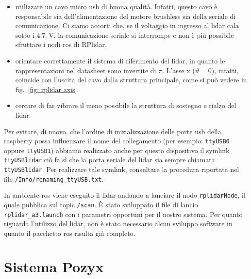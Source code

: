 \begin{itemize}
	\item utilizzare un cavo micro usb di buona qualità. Infatti, questo cavo è responsabile sia dell'alimentazione del motore brushless sia della seriale di comunicazione.
			Ci siamo accorti che, se il voltaggio in ingresso al lidar cala sotto i \SI{4.7}{\volt}, la comunicazione seriale si interrompe e non è più possibile sfruttare i nodi ros di RPlidar.

	\item orientare correttamente il sistema di riferimento del lidar, in quanto le rappresentazioni nel datasheet sono invertite di $\pi$. 
	L'asse x ($\vartheta = 0$), infatti, coincide con l'uscita del cavo dalla struttura principale, come si può vedere in fig.~\ref{fig: rplidar axis}.

	\item cercare di far vibrare il meno possibile la struttura di sostegno e rialzo del lidar.

\end{itemize}

Per evitare, di nuovo, che l'ordine di inizializzazione delle porte usb della raspberry possa influenzare il nome del collegamento (per esempio: \texttt{ttyUSB0} oppure \texttt{ttyUSB1})
abbiamo realizzato anche per questo dispositivo il symlink \texttt{ttyUSBlidar}:ciò fa sì che la porta seriale del lidar sia sempre chiamata \texttt{ttyUSBlidar}. 
Per realizzare tale symlink, consultare la procedura riportata nel file \texttt{/Info/renaming\_ttyUSB.txt}.

In ambiente ros viene eseguito il lidar andando a lanciare il nodo \texttt{rplidarNode}, il quale pubblica sul topic \texttt{/scan}. 
\`E stato sviluppato il file di lancio \texttt{rplidar\_a3.launch} con i parametri opportuni per il nostro sistema.  
Per quanto riguarda l'utilizzo del lidar, non è stato necessario alcun sviluppo software in quanto il pacchetto ros risulta già completo.


\newpage
\section{Sistema Pozyx}
\label{sez:Sistema Pozyx}

